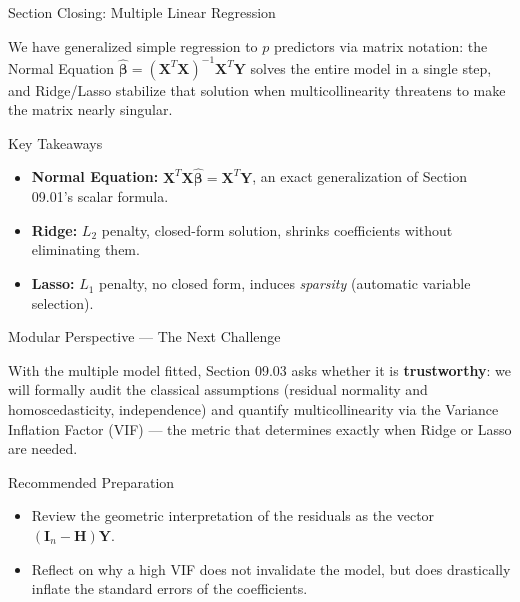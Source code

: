 \documentclass[10pt, aspectratio=169]{beamer}
\begin{document}
\begin{frame}{Section Closing: Multiple Linear Regression}
  \begin{reflexion}
    We have generalized simple regression to $p$ predictors via matrix notation: the Normal Equation $\hat{\boldsymbol\beta}=(\mathbf{X}^T\mathbf{X})^{-1}\mathbf{X}^T\mathbf{Y}$ solves the entire model in a single step, and Ridge/Lasso stabilize that solution when multicollinearity threatens to make the matrix nearly singular.
  \end{reflexion}

  \vspace{0.2cm}
  \pause
  \begin{block}{Key Takeaways}
    \begin{itemize}\itemsep=0.08cm
      \item \textbf{Normal Equation:} $\mathbf{X}^T\mathbf{X}\hat{\boldsymbol\beta}=\mathbf{X}^T\mathbf{Y}$, an exact generalization of Section 09.01's scalar formula.
      \item \textbf{Ridge:} $L_2$ penalty, closed-form solution, shrinks coefficients without eliminating them.
      \item \textbf{Lasso:} $L_1$ penalty, no closed form, induces \emph{sparsity} (automatic variable selection).
    \end{itemize}
  \end{block}
\end{frame}

\begin{frame}{Modular Perspective --- The Next Challenge}
  \scriptsize
  \begin{retoclase}
    With the multiple model fitted, Section 09.03 asks whether it is \textbf{trustworthy}: we will formally audit the classical assumptions (residual normality and homoscedasticity, independence) and quantify multicollinearity via the Variance Inflation Factor (VIF) --- the metric that determines exactly when Ridge or Lasso are needed.
  \end{retoclase}

  \vspace{0.08cm}
  \pause
  \begin{alertblock}{Recommended Preparation}
    \begin{itemize}\itemsep=0.06cm
      \item Review the geometric interpretation of the residuals as the vector $(\mathbf{I}_n-\mathbf{H})\mathbf{Y}$.
      \item Reflect on why a high VIF does not invalidate the model, but does drastically inflate the standard errors of the coefficients.
    \end{itemize}
  \end{alertblock}
\end{frame}
\end{document}
